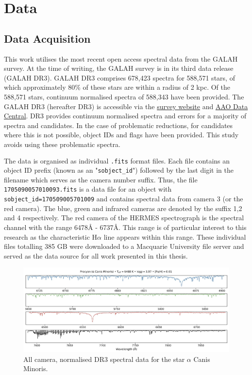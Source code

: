 \chapter{Data}

\section{Data Acquisition}

This work utilises the most recent open access spectral data from the GALAH survey. At the time of writing, the GALAH survey is in its third data release (GALAH DR3). GALAH DR3 comprises 678,423 spectra for 588,571 stars, of which approximately 80\% of these stars are within a radius of 2 kpc\cite{buder2021galah+}. Of the 588,571 stars, continuum normalised spectra of 588,343 have been provided. The GALAH DR3 (hereafter DR3) is accessible via the \href{https://www.galah-survey.org/}{survey website} and \href{https://datacentral.org.au/}{AAO Data Central}. DR3 provides continuum normalised spectra and errors for a majority of spectra and candidates. In the case of problematic reductions, for candidates where this is not possible, object IDs and flags have been provided. This study avoids using these problematic spectra.

The data is organised as individual \texttt{.fits} format files. Each file contains an object ID prefix (known as an "\texttt{sobject\_id}") followed by the last digit in the filename which serves as the camera number suffix. Thus, the file \texttt{1705090057010093.fits} is a data file for an object with \texttt{sobject\_id=170509005701009} and contains spectral data from camera 3 (or the red camera). The blue, green and infrared cameras are denoted by the suffix 1,2 and 4 respectively.
The red camera of the HERMES spectrograph is the spectral channel with the range 6478\r{A} - 6737\r{A}\cite{sheinis2014first}. This range is of particular interest to this research as the characteristic H$\alpha$ line appears within this range. These individual files totalling 385 GB were downloaded to a Macquarie University file server and served as the data source for all work presented in this thesis.

\begin{figure}[!htb]
\centering
\includegraphics[scale=.25]{figures/galah cameras.jpeg}
\caption{All camera, normalised DR3 spectral data for the star $\alpha$ Canis Minoris.}
\end{figure}

